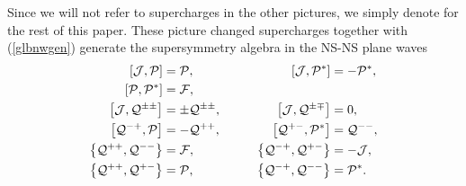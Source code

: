 \documentclass[a4paper,seceq,preprint]{ptptex}
\begin{document}
Since we will not refer to supercharges in the other pictures,
we simply denote \coordHE{} 
for the rest of this paper. These picture changed supercharges
together with (\ref{glbnwgen}) generate
the supersymmetry algebra in the NS-NS plane waves\cite{HS2}
\begin{alignat}{2}
\left[{\cal J},{\cal P}\right]&={\cal P},&\qquad
\left[{\cal J},{\cal P}^*\right]&=-{\cal P}^*,\nonumber\\
\left[{\cal P},{\cal P}^*\right]&={\cal F},& &\nonumber\\
\left[{\cal J},{\cal Q}^{\pm\pm}\right]&=\pm{\cal Q}^{\pm\pm},
&\qquad
\left[{\cal J},{\cal Q}^{\pm\mp}\right]&=0,\nonumber\\
\left[{\cal Q}^{-+},{\cal P}\right]&=-{\cal Q}^{++},&\qquad
\left[{\cal Q}^{+-},{\cal P}^*\right]&={\cal Q}^{--},\nonumber\\
 \left\{{\cal Q}^{++},{\cal Q}^{--}\right\}&={\cal F},&\qquad
 \left\{{\cal Q}^{-+},{\cal Q}^{+-}\right\}&=-{\cal J},\nonumber\\
 \left\{{\cal Q}^{++},{\cal Q}^{+-}\right\}&={\cal P},&\qquad
 \left\{{\cal Q}^{-+},{\cal Q}^{--}\right\}&={\cal P}^*.\label{alg}
\end{alignat}
\end{document}
